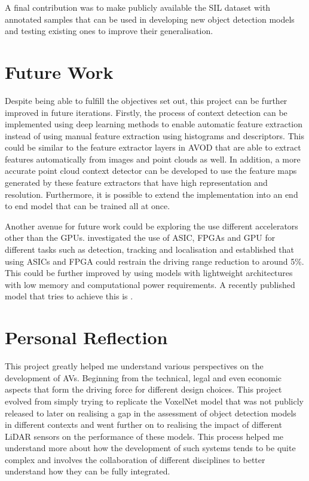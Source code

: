 A final contribution was to make publicly available the SIL dataset with annotated samples that can be used in developing new object detection models and testing existing ones to improve their generalisation. 

\section{Future Work}
Despite being able to fulfill the objectives set out, this project can be further improved in future iterations. 
Firstly, the process of context detection can be implemented using deep learning methods to enable automatic feature extraction instead of using manual feature extraction using histograms and descriptors. This could be similar to the feature extractor layers in AVOD that are able to extract features automatically from images and point clouds as well. In addition, a more accurate point cloud context detector can be developed to use the feature maps generated by these feature extractors that have high representation and resolution. Furthermore, it is possible to extend the implementation into an end to end model that can be trained all at once. 

Another avenue for future work could be exploring the use different accelerators other than the GPUs. \cite{lin2018architectural} investigated the use of ASIC, FPGAs and GPU for different tasks such as detection, tracking and localisation and established that using ASICs and FPGA could restrain the driving range reduction to around 5\%. This could be further improved by using models with lightweight architectures with low memory and computational power requirements. A recently published model that tries to achieve this is \cite{wang2018pointseg}. 

\section{Personal Reflection}

This project greatly helped me understand various perspectives on the development of AVs. Beginning from the technical, legal and even economic aspects that form the driving force for different design choices. This project evolved from simply trying to replicate the VoxelNet model that was not publicly released to later on realising a gap in the assessment of object detection models in different contexts and went further on to realising the impact of different LiDAR sensors on the performance of these models. This process helped me understand more about how the development of such systems tends to be quite complex and involves the collaboration of different disciplines to better understand how they can be fully integrated.

